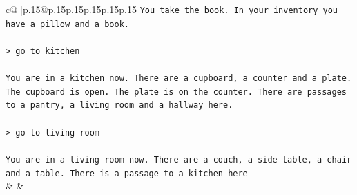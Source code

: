 \documentclass{article}
\begin{document}
{\begin{supertabular}{c@{$\;$}|p{.15\linewidth}@{}p{.15\linewidth}p{.15\linewidth}p{.15\linewidth}p{.15\linewidth}p{.15\linewidth}}
{{{\texttt{You take the book. In your inventory you have a pillow and a book.} \\
\\ 
\texttt{> go to kitchen} \\
\\ 
\texttt{You are in a kitchen now. There are a cupboard, a counter and a plate. The cupboard is open. The plate is on the counter. There are passages to a pantry, a living room and a hallway here.} \\
\\ 
\texttt{> go to living room} \\
\\ 
\texttt{You are in a living room now. There are a couch, a side table, a chair and a table. There is a passage to a kitchen here} \\
            }
        }
    }
    & & \\ \\


\end{supertabular}}
\end{document}
